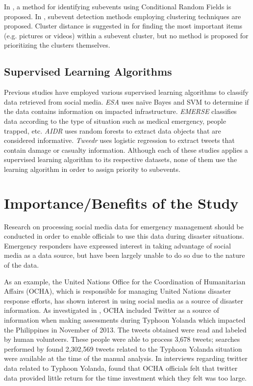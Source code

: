 \documentclass[conference]{IEEEtran}
\begin{document}
In \cite{Khurdiya}, a method for identifying subevents using Conditional Random Fields is proposed. In \cite{Pohl,Hua}, subevent detection methods employing clustering techniques are proposed. Cluster distance is suggested in \cite{Pohl} for finding the most important items (e.g. pictures or videos) within a subevent cluster, but no method is proposed for prioritizing the clusters themselves.

\subsection{Supervised Learning Algorithms}
Previous studies have employed various supervised learning algorithms to classify data retrieved from social media. \textit{ESA} \cite{yin}  uses na\"{i}ve Bayes and SVM to determine if the data contains information on impacted infrastructure. \textit{EMERSE} \cite{caragea} classifies data according to the type of situation such as medical emergency, people trapped, etc. \textit{AIDR} \cite{Imran2014a} uses random forests to extract data objects that are considered informative. \textit{Tweedr} \cite{ashktorab} uses logistic regression to extract tweets that contain damage or casualty information. Although each of these studies applies a supervised learning algorithm to its respective datasets, none of them use the learning algorithm in order to assign priority to subevents.

\section{Importance/Benefits of the Study}
Research on processing social media data for emergency management should be conducted in order to enable officials to use this data during disaster situations. Emergency responders have expressed interest in taking advantage of social media as a data source, but have been largely unable to do so due to the nature of the data.

As an example, the United Nations Office for the Coordination of Humanitarian Affairs (OCHA), which is responsible for managing United Nations disaster response efforts, has shown interest in using social media as a source of disaster information. As investigated in \cite{vieweg2014}, OCHA included Twitter as a source of information when making assessments during Typhoon Yolanda which impacted the Philippines in November of 2013. The tweets obtained were read and labeled by human volunteers. These people were able to process 3,678 tweets; searches performed by \cite{vieweg2014} found 2,302,569 tweets related to the Typhoon Yolanda situation were available at the time of the manual analysis. In interviews regarding twitter data related to Typhoon Yolanda, \cite{vieweg2014} found that OCHA officials felt that twitter data provided little return for the time investment which they felt was too large.
\end{document}
